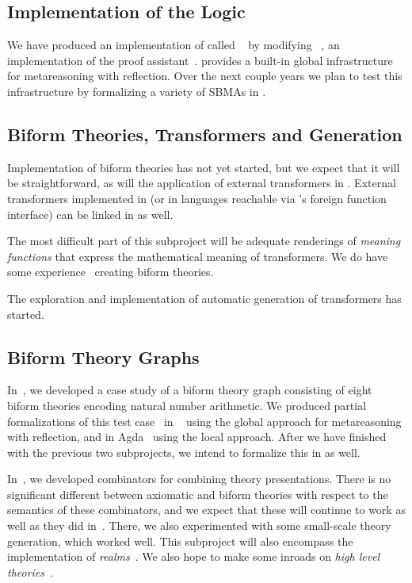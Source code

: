 \documentclass[fleqn]{llncs}
\begin{document}
\subsection*{Implementation of the Logic}

We have produced an implementation of {\churchqe} called
{\HLQE}~\cite{CaretteFarmerLaskowski18} by modifying
{\HL}~\cite{Harrison09}, an implementation of the {\HOL} proof
assistant~\cite{GordonMelham93}.  {\HLQE} provides a built-in global
infrastructure for metareasoning with reflection.  Over the next
couple years we plan to test this infrastructure by formalizing a
variety of SBMAs in {\HLQE}.

\subsection*{Biform Theories, Transformers and Generation}

Implementation of biform theories has not yet started, but we expect
that it will be straightforward, as will the application of external
transformers in {\HLQE}.  External transformers implemented in
{\OCAML} (or in languages reachable via {\OCAML}'s foreign function
interface) can be linked in as well.

The most difficult part of this subproject will be adequate
renderings of \emph{meaning functions} that express the mathematical
meaning of transformers. We do have some 
experience~\cite{CaretteFarmer17,CaretteFarmerSorge07} creating
biform theories.

The exploration and implementation of automatic generation of
transformers has started.

\subsection*{Biform Theory Graphs}

In~\cite{CaretteFarmer17}, we developed a case study of a biform
theory graph consisting of eight biform theories encoding natural number
arithmetic.  We produced partial formalizations of this test
case~\cite{CaretteFarmer17} in {\churchuqe}~\cite{Farmer17} using the
global approach for metareasoning with reflection, and in
Agda~\cite{Norell07,Norell09} using the local approach.  After we have
finished with the previous two subprojects, we intend to formalize this
in {\HLQE} as well.

In~\cite{CaretteOConnorTPC}, we developed combinators for combining
theory presentations. There is no significant different between
axiomatic and biform theories with respect to the semantics of
these combinators, and we expect that these will continue to work
as well as they did in~\cite{MathSchemeExper}. There, we also
experimented with some small-scale theory generation, which worked
well. This subproject will also encompass the implementation of
\emph{realms}~\cite{CaretteEtAl14}.  We also hope to make some
inroads on \emph{high level theories}~\cite{CaretteFarmer08}.
\end{document}
